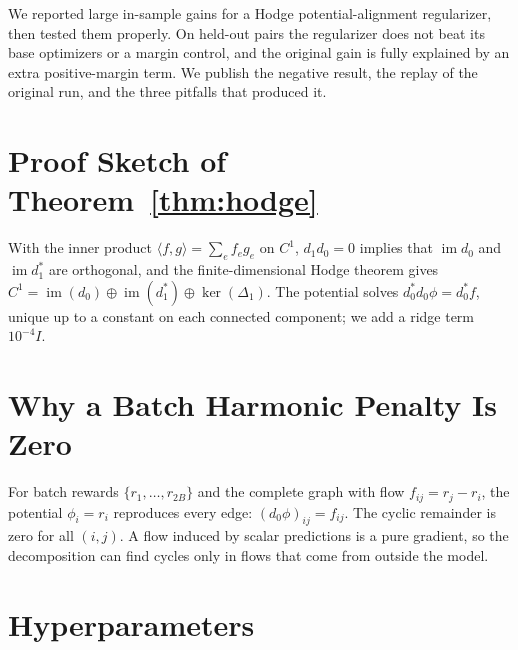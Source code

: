 \documentclass{article}
\begin{document}
We reported large in-sample gains for a Hodge potential-alignment regularizer, then tested them properly. On held-out pairs the regularizer does not beat its base optimizers or a margin control, and the original gain is fully explained by an extra positive-margin term. We publish the negative result, the replay of the original run, and the three pitfalls that produced it.




\newpage
\appendix

\section{Proof Sketch of Theorem~\ref{thm:hodge}}
\label{app:hodge_proof}

With the inner product $\langle f, g \rangle = \sum_e f_e g_e$ on $C^1$, $d_1 d_0 = 0$ implies that $\operatorname{im} d_0$ and $\operatorname{im} d_1^{*}$ are orthogonal, and the finite-dimensional Hodge theorem gives $C^1 = \operatorname{im}(d_0) \oplus \operatorname{im}(d_1^{*}) \oplus \ker(\Delta_1)$. The potential solves $d_0^{*} d_0 \phi = d_0^{*} f$, unique up to a constant on each connected component; we add a ridge term $10^{-4} I$.

\section{Why a Batch Harmonic Penalty Is Zero}
\label{app:batch_penalty}

For batch rewards $\{r_1, \dots, r_{2B}\}$ and the complete graph with flow $f_{ij} = r_j - r_i$, the potential $\phi_i = r_i$ reproduces every edge: $(d_0\phi)_{ij} = f_{ij}$. The cyclic remainder is zero for all $(i,j)$. A flow induced by scalar predictions is a pure gradient, so the decomposition can find cycles only in flows that come from outside the model.

\section{Hyperparameters}
\label{app:implementation}
\end{document}
